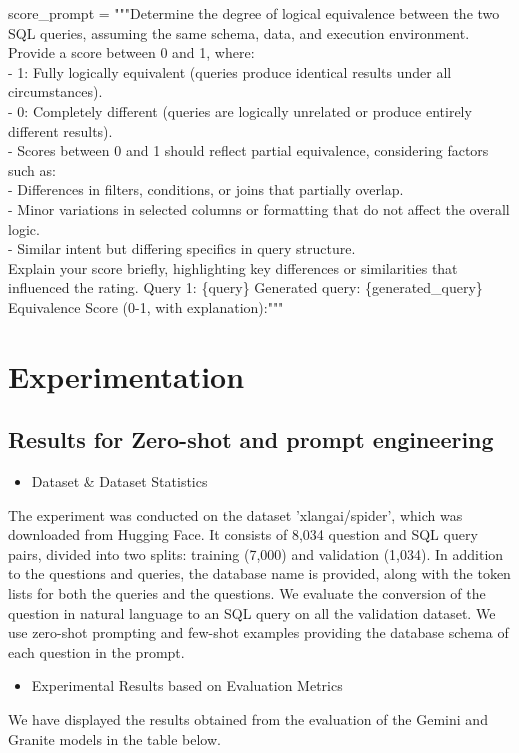 \documentclass[12pt,a4paper]{article}
\begin{document}
score\_prompt = """Determine the degree of logical equivalence between the two SQL queries, assuming the same schema, data, and execution environment. Provide a score between 0 and 1, where:
\\
- 1: Fully logically equivalent (queries produce identical results under all circumstances).
\\
- 0: Completely different (queries are logically unrelated or produce entirely different results).
\\
- Scores between 0 and 1 should reflect partial equivalence, considering factors such as:
\\
- Differences in filters, conditions, or joins that partially overlap.
\\
- Minor variations in selected columns or formatting that do not affect the overall logic.
\\
- Similar intent but differing specifics in query structure.
\\
Explain your score briefly, highlighting key differences or similarities that influenced the rating.
Query 1:
\{query\}
Generated query:
\{generated\_query\}
Equivalence Score (0-1, with explanation):"""






\section*{Experimentation}
\subsection*{Results for Zero-shot and prompt engineering}

\begin{itemize}
  \item Dataset \& Dataset Statistics
  \end{itemize}
  The experiment was conducted on the dataset 'xlangai/spider', which was downloaded from Hugging Face. It consists of 8,034 question and SQL query pairs, divided into two splits: training (7,000) and validation (1,034). In addition to the questions and queries, the database name is provided, along with the token lists for both the queries and the questions. We evaluate the conversion of the question in natural language to an SQL query on all the validation dataset. We use zero-shot prompting and few-shot examples providing the database schema of each question in the prompt.
  
  \begin{itemize}
  \item Experimental Results based on Evaluation Metrics
  \end{itemize}
  We have displayed the results obtained from the evaluation of the Gemini and Granite models in the table below.
  
\end{document}
